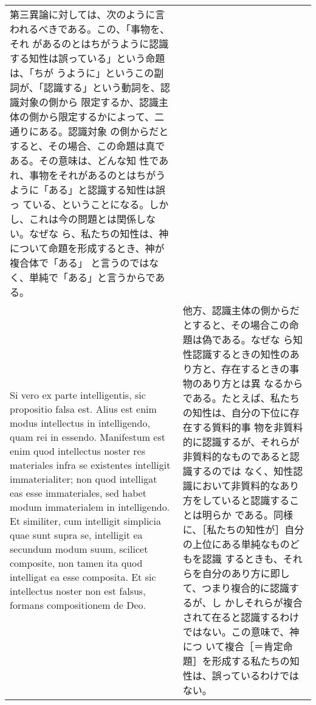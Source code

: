 \documentclass[10pt]{jsarticle} %
\begin{document}
\begin{longtable}{p{21em}p{21em}}
第三異論に対しては、次のように言われるべきである。この、「事物を、それ
があるのとはちがうように認識する知性は誤っている」という命題は、「ちが
うように」というこの副詞が、「認識する」という動詞を、認識対象の側から
限定するか、認識主体の側から限定するかによって、二通りにある。認識対象
の側からだとすると、その場合、この命題は真である。その意味は、どんな知
性であれ、事物をそれがあるのとはちがうように「ある」と認識する知性は誤っ
ている、ということになる。しかし、これは今の問題とは関係しない。なぜな
ら、私たちの知性は、神について命題を形成するとき、神が複合体で「ある」
と言うのではなく、単純で「ある」と言うからである。

\\

Si vero ex parte intelligentis, sic propositio falsa
est. Alius est enim modus intellectus in intelligendo, quam rei in
essendo. Manifestum est enim quod intellectus noster res materiales
infra se existentes intelligit immaterialiter; non quod intelligat eas
esse immateriales, sed habet modum immaterialem in intelligendo. Et
similiter, cum intelligit simplicia quae sunt supra se, intelligit ea
secundum modum suum, scilicet composite, non tamen ita quod intelligat
ea esse composita. Et sic intellectus noster non est falsus, formans
compositionem de Deo.


&

他方、認識主体の側からだとすると、その場合この命題は偽である。なぜな
ら知性認識するときの知性のあり方と、存在するときの事物のあり方とは異
なるからである。たとえば、私たちの知性は、自分の下位に存在する質料的事
物を非質料的に認識するが、それらが非質料的なものであると認識するのでは
なく、知性認識において非質料的なあり方をしていると認識することは明らか
である。同様に、［私たちの知性が］自分の上位にある単純なものどもを認識
するときも、それらを自分のあり方に即して、つまり複合的に認識するが、し
かしそれらが複合されて在ると認識するわけではない。この意味で、神につ
いて複合［＝肯定命題］を形成する私たちの知性は、誤っているわけではない。


\end{longtable}
\end{document}
